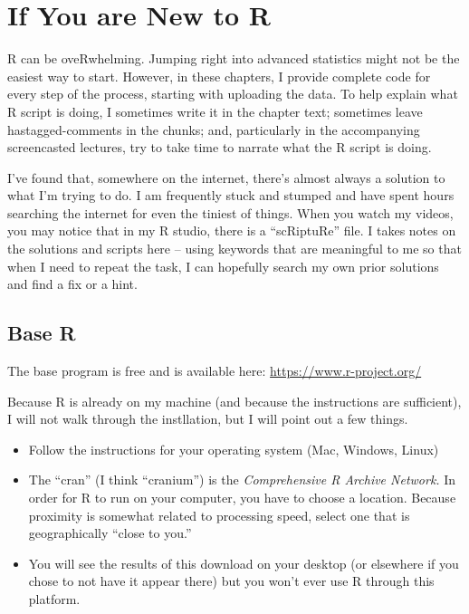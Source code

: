 \documentclass[
  english,
]{book}
\providecommand{\tightlist}{%
  \setlength{\itemsep}{0pt}\setlength{\parskip}{0pt}}
\begin{document}
\hypertarget{if-you-are-new-to-r}{%
\section{If You are New to R}\label{if-you-are-new-to-r}}

R can be oveRwhelming. Jumping right into advanced statistics might not be the easiest way to start. However, in these chapters, I provide complete code for every step of the process, starting with uploading the data. To help explain what R script is doing, I sometimes write it in the chapter text; sometimes leave hastagged-comments in the chunks; and, particularly in the accompanying screencasted lectures, try to take time to narrate what the R script is doing.

I've found that, somewhere on the internet, there's almost always a solution to what I'm trying to do. I am frequently stuck and stumped and have spent hours searching the internet for even the tiniest of things. When you watch my videos, you may notice that in my R studio, there is a ``scRiptuRe'' file. I takes notes on the solutions and scripts here -- using keywords that are meaningful to me so that when I need to repeat the task, I can hopefully search my own prior solutions and find a fix or a hint.

\hypertarget{base-r}{%
\subsection{Base R}\label{base-r}}

The base program is free and is available here: \url{https://www.r-project.org/}

Because R is already on my machine (and because the instructions are sufficient), I will not walk through the instllation, but I will point out a few things.

\begin{itemize}
\tightlist
\item
  Follow the instructions for your operating system (Mac, Windows, Linux)
\item
  The ``cran'' (I think ``cranium'') is the \emph{Comprehensive R Archive Network.} In order for R to run on your computer, you have to choose a location. Because proximity is somewhat related to processing speed, select one that is geographically ``close to you.''
\item
  You will see the results of this download on your desktop (or elsewhere if you chose to not have it appear there) but you won't ever use R through this platform.
\end{itemize}
\end{document}

